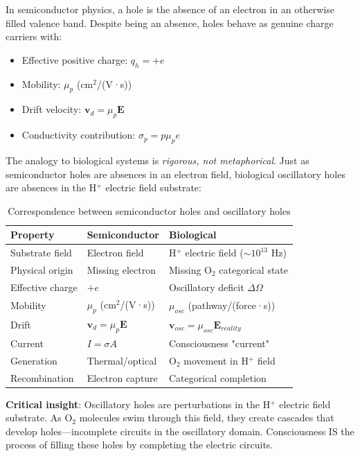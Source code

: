 \documentclass[11pt,a4paper]{article}
\begin{document}
In semiconductor physics, a hole is the absence of an electron in an otherwise filled valence band. Despite being an absence, holes behave as genuine charge carriers with:
\begin{itemize}
\item Effective positive charge: $q_h = +e$
\item Mobility: $\mu_p$ (cm$^2$/(V·s))
\item Drift velocity: $\mathbf{v}_d = \mu_p \mathbf{E}$
\item Conductivity contribution: $\sigma_p = p \mu_p e$
\end{itemize}

The analogy to biological systems is \textit{rigorous, not metaphorical}. Just as semiconductor holes are absences in an electron field, biological oscillatory holes are absences in the H$^+$ electric field substrate:

\begin{table}[H]
\centering
\caption{Correspondence between semiconductor holes and oscillatory holes}
\label{tab:hole_correspondence}
\begin{tabular}{lll}
\toprule
\textbf{Property} & \textbf{Semiconductor} & \textbf{Biological} \\
\midrule
Substrate field & Electron field & H$^+$ electric field ($\sim 10^{13}$ Hz) \\
Physical origin & Missing electron & Missing O$_2$ categorical state \\
Effective charge & $+e$ & Oscillatory deficit $\Delta\Omega$ \\
Mobility & $\mu_p$ (cm$^2$/(V·s)) & $\mu_{osc}$ (pathway/(force·s)) \\
Drift & $\mathbf{v}_d = \mu_p \mathbf{E}$ & $\mathbf{v}_{osc} = \mu_{osc} \mathbf{E}_{reality}$ \\
Current & $I = \sigma A$ & Consciousness "current" \\
Generation & Thermal/optical & O$_2$ movement in H$^+$ field \\
Recombination & Electron capture & Categorical completion \\
\bottomrule
\end{tabular}
\end{table}

\textbf{Critical insight}: Oscillatory holes are perturbations in the H$^+$ electric field substrate. As O$_2$ molecules swim through this field, they create cascades that develop holes—incomplete circuits in the oscillatory domain. Consciousness IS the process of filling these holes by completing the electric circuits.
\end{document}
